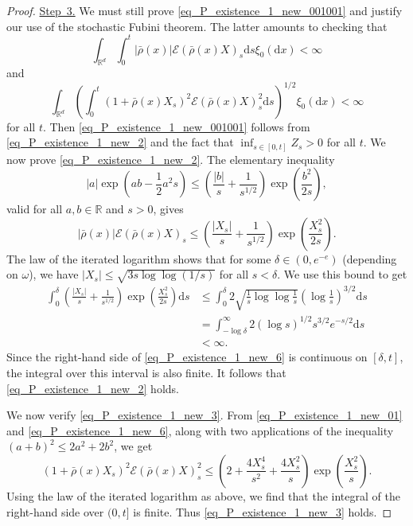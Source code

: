 \documentclass{article}
\theoremstyle{definition}
\numberwithin{equation}{section}
\numberwithin{theorem}{section}
\newcommand{\R}{\mathbb{R}}
\newcommand{\dx}{\mathrm{d}x}
\newcommand{\ds}{\mathrm{d}s}
\newcommand{\Ec}{\mathcal{E}}
\begin{document}
\begin{proof}
\underline{Step~3.}
We must still prove \eqref{eq_P_existence_1_new_001001} and justify our use of the stochastic Fubini theorem. The latter amounts to checking that
\begin{equation}\label{eq_P_existence_1_new_2}
\int_{\R^d} \int_0^t |\bar\rho(x)|\Ec(\bar\rho(x)X)_s \ds \xi_0(\dx) < \infty
\end{equation}
and
\begin{equation}\label{eq_P_existence_1_new_3}
\int_{\R^d} \left( \int_0^t (1+\bar\rho(x)X_s)^2\Ec(\bar\rho(x)X)_s^2\ds\right)^{1/2} \xi_0(\dx) < \infty
\end{equation}
for all $t$. Then \eqref{eq_P_existence_1_new_001001} follows from \eqref{eq_P_existence_1_new_2} and the fact that $\inf_{s\in[0,t]}Z_s>0$ for all $t$. We now prove \eqref{eq_P_existence_1_new_2}. The elementary inequality
\[
|a| \exp\left( ab - \frac12 a^2s\right) \le \left(\frac{|b|}{s} + \frac{1}{s^{1/2}} \right) \exp\left( \frac{b^2}{2s} \right),
\]
valid for all $a,b\in\R$ and $s>0$, gives
\begin{equation}\label{eq_P_existence_1_new_6}
|\bar\rho(x)|\Ec(\bar\rho(x)X)_s \le \left(\frac{|X_s|}{s} + \frac{1}{s^{1/2}} \right) \exp\left( \frac{X_s^2}{2s} \right).
\end{equation}
The law of the iterated logarithm shows that for some $\delta\in(0,e^{-e})$ (depending on $\omega$), we have $|X_s| \le \sqrt{3s\log\log(1/s)}$ for all $s<\delta$. We use this bound to get
\begin{align*}
\int_0^\delta \left(\frac{|X_s|}{s} + \frac{1}{s^{1/2}} \right) \exp\left( \frac{X_s^2}{2s} \right) \ds &\le  \int_0^\delta 2 \sqrt{\frac1s\log\log\frac1s} \left(\log\frac1s\right)^{3/2} \ds \\
&= \int_{-\log\delta}^\infty 2 (\log s)^{1/2}  s^{3/2} e^{-s/2} \ds \\
&< \infty.
\end{align*}
Since the right-hand side of \eqref{eq_P_existence_1_new_6} is continuous on $[\delta,t]$, the integral over this interval is also finite. It follows that \eqref{eq_P_existence_1_new_2} holds.

We now verify \eqref{eq_P_existence_1_new_3}. From \eqref{eq_P_existence_1_new_01} and \eqref{eq_P_existence_1_new_6}, along with two applications of the inequality $(a+b)^2\le 2a^2+2b^2$, we get
\[
(1+\bar\rho(x)X_s)^2\Ec(\bar\rho(x)X)_s^2 \le  \left( 2 + \frac{4 X_s^4}{s^2} + \frac{4 X_s^2}{s} \right) \exp\left( \frac{X_s^2}{s} \right).
\]
Using the law of the iterated logarithm as above, we find that the integral of the right-hand side over $(0,t]$ is finite. Thus \eqref{eq_P_existence_1_new_3} holds.






\end{proof}
\end{document}
